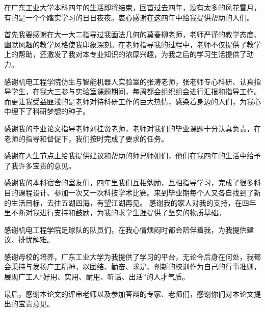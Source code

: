 在广东工业大学本科四年的生活即将结束，回首过去四年，没有太多的风花雪月，有的是一个个踏实学习的日日夜夜。衷心感谢在这四年中给我提供帮助的人们。\par
首先我要感谢在大一大二指导过我画法几何的莫春柳老师，老师严谨的教学态度、幽默风趣的教学风格使我印象深刻。在老师指导我的过程中，老师不仅提供了教学上的帮助，还激发了我对本专业知识的浓厚兴趣，为我之后的学习生活提供了动力。\par
感谢机电工程学院仿生与智能机器人实验室的张涛老师，张老师专心科研、认真指导学生，在我大三参与实验室课题期间，每周都会组织组会进行汇报和指导工作。而更让我受益匪浅的是老师对待科研工作的巨大热情，感染着身边的人们，为我心中埋下了科研梦想的种子。\par
感谢我的毕业论文指导老师刘桂贤老师，老师对我们的毕业课题十分认真负责，在老师的指导和督促下，我们按时完成了要求的任务。\par
感谢在人生节点上给我提供建议和帮助的师兄师姐们，他们在我四年的生活中给予了我许多宝贵的意见。\par
感谢我的本科宿舍的室友们，四年里我们互相勉励，互相指导学习，完成了很多科目的课程设计、参加一次又一次科技学术比赛。来到毕业期每个人又各自找到了新的生活目标，去往五湖四海，有望江湖再见。
感谢我的家人对我的支持，在四年里不断对我进行支持和鼓励，为我的求学生涯提供了坚实的物质基础。\par
感谢机电工程学院足球队的队员们，在我心情烦闷时都会陪伴着我，为我提供建议、排忧解难。\par
感谢母校的培养，广东工业大学为我提供了学习的平台，无论今后身在何处，我都会秉持与发扬广工精神，以团结、勤奋、求是、创新的校训作为自己的行事准则，展现广工人“好用、实用、耐用、听话、出活”的人才气质。\par
最后，感谢本论文的评审老师以及参加答辩的专家、老师们，感谢你们对本论文提出的宝贵意见。